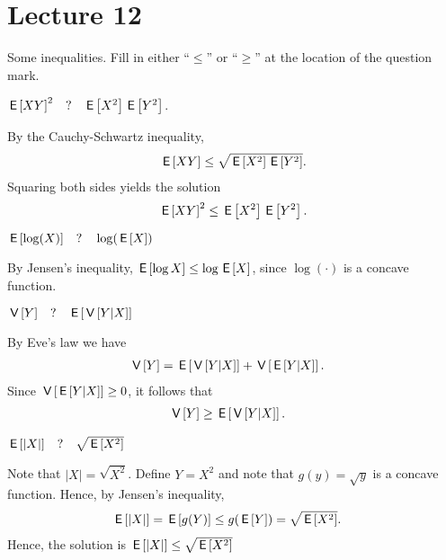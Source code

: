 \documentclass[lectures]{subfiles}
\begin{document}
\section{Lecture 12}

Some inequalities. Fill in either ``$\leq$'' or ``$\geq$'' at the location of the question mark.



\begin{exercise}
$\E{XY}^2 \quad?\quad \E{X^2}\E{Y^2}$.
\begin{solution}
By the Cauchy-Schwartz inequality,
\begin{align}
    \E{XY} \leq \sqrt{\E{X^2}\E{Y^2}}.
\end{align}
Squaring both sides yields the solution
\begin{align}
    \E{XY}^2 \leq \E{X^2}\E{Y^2}.
\end{align}
\end{solution}
\end{exercise}


\begin{exercise}
$\E{\log (X) } \quad?\quad \log(\E{X})$
\begin{solution}
By Jensen's inequality, $\E{\log X } \leq \log \E{X}$, since $\log(\cdot)$ is a concave function.
\end{solution}
\end{exercise}

\begin{exercise}
$\V{Y} \quad?\quad \E{\V{Y|X}}$
\begin{solution}
By Eve's law we have
\begin{align}
    \V{Y} &= \E{\V{Y|X}} + \V{\E{Y|X}}.
\end{align}
Since $\V{\E{Y|X}} \geq 0$, it follows that
\begin{align}
    \V{Y} &\geq \E{\V{Y|X}}.
\end{align}
\end{solution}
\end{exercise}

\begin{exercise}
$\E{|X|} \quad?\quad \sqrt{\E{X^2}}$
\begin{solution}
Note that $|X| = \sqrt{X^2}$. Define $Y = X^2$ and note that $g(y) = \sqrt{y}$ is a concave function. Hence, by Jensen's inequality,
\begin{align}
    \E{|X|} &= \E{g(Y)} \leq g(\E{Y}) = \sqrt{\E{X^2}}.
\end{align}
Hence, the solution is $\E{|X|} \leq \sqrt{\E{X^2}}$
\end{solution}
\end{exercise}
\end{document}
